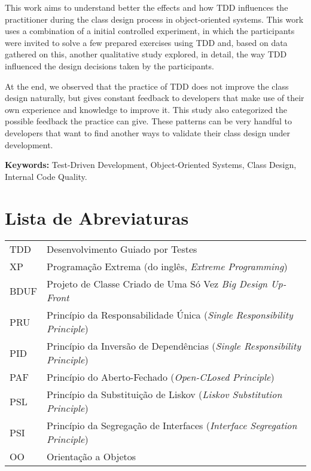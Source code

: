 \documentclass[11pt,openany,twoside,a4paper]{book}
\begin{document}
This work aims to understand better the effects and how TDD influences the
practitioner during the class design process in object-oriented systems. 
This work uses a combination of a initial controlled experiment, in which the participants
were invited to solve a few prepared exercises using TDD and, based on data gathered on this,
another qualitative study explored, in detail, the way TDD influenced the design decisions
taken by the participants.

At the end, we observed that the practice of TDD does not improve the class design naturally, but
gives constant feedback to developers that make use of their own experience and knowledge to
improve it. This study also categorized the possible feedback the practice can give. These
patterns can be very handful to developers that want to find another ways to validate
their class design under development.

\noindent \textbf{Keywords:} Test-Driven Development, Object-Oriented
Systems, Class Design, Internal Code Quality.

\tableofcontents    %

\chapter{Lista de Abreviaturas}
\begin{tabular}{ll}
         TDD         & Desenvolvimento Guiado por Testes\\ 
         
         XP          & Programação Extrema (do inglês, \emph{Extreme Programming})\\
		 
		 BDUF		 & Projeto de Classe Criado de Uma Só Vez \textit{Big Design Up-Front}\\
		 
		 PRU		 & Princípio da Responsabilidade Única (\emph{Single Responsibility
		 Principle})\\
		 
		 PID		 & Princípio da Inversão de Dependências (\emph{Single Responsibility
		 Principle})\\ 
		 
		 PAF		 & Princípio do Aberto-Fechado (\emph{Open-CLosed Principle})\\
		 
		 PSL	 	 & Princípio da Substituição de Liskov (\emph{Liskov Substitution
		 Principle})\\
		 
		 PSI		 & Princípio da Segregação de Interfaces (\emph{Interface Segregation
		 Principle})\\
		 
		 OO		 	 & Orientação a Objetos
		 
\end{tabular}
\end{document}
